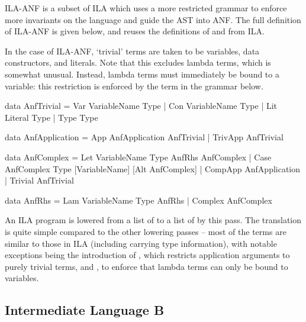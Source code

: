 \documentclass[dissertation.tex]{subfiles}
\begin{document}
{{        ILA-ANF is a subset of ILA which uses a more restricted grammar to enforce more invariants on the language
        and guide the AST into ANF. The full definition of ILA-ANF is given below, and reuses the definitions of
         and  from ILA.

        In the case of ILA-ANF, `trivial' terms are taken to be variables, data constructors, and literals. Note
        that this excludes lambda terms, which is somewhat unusual. Instead, lambda terms must immediately be bound
        to a variable: this restriction is enforced by the  term in the grammar below.


        \begin{haskellfigure}
        data AnfTrivial = Var VariableName Type
                        | Con VariableName Type
                        | Lit Literal Type
                        | Type Type

        data AnfApplication = App AnfApplication AnfTrivial
                            | TrivApp AnfTrivial

        data AnfComplex = Let VariableName Type AnfRhs AnfComplex
                        | Case AnfComplex Type [VariableName] [Alt AnfComplex]
                        | CompApp AnfApplication
                        | Trivial AnfTrivial

        data AnfRhs = Lam VariableName Type AnfRhs
                    | Complex AnfComplex
        \end{haskellfigure}

        An ILA program is lowered from a list of  to a list of  by
        this pass. The translation is quite simple compared to the other lowering passes -- most of the terms are
        similar to those in ILA (including carrying type information), with notable exceptions being the
        introduction of , which restricts application arguments to purely trivial terms, and
        , to enforce that lambda terms can only be bound to variables.

    }
    \subsection{Intermediate Language B}
    {

}}
\end{document}
